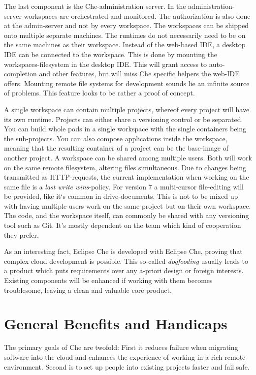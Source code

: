 \documentclass[utf8]{lni}
\begin{document}
The last component is the Che-administration server. 
In the administration-server workspaces are orchestrated and monitored. 
The authorization is also done at the admin-server and not by every workspace.
The workspaces can be shipped onto multiple separate machines.
The runtimes do not necessarily need to be on the same machines as their workspace. 
Instead of the web-based IDE, a desktop IDE can be connected to the workspace. 
This is done by mounting the workspaces-filesystem in the desktop  IDE. 
This  will grant access to auto-completion and other features, but will miss Che specific helpers the web-IDE offers. 
Mounting remote file systems for development sounds lie an infinite source of problems.
This feature looks to be rather a proof of concept.

A single workspace can contain multiple projects, whereof every project will have its own runtime. 
Projects can either share a versioning control or be separated. 
You can build whole pods in a single workspace with the single containers being the sub-projects. 
You can also compose applications inside the workspace, meaning that the resulting 
container of a project can be the base-image of another project. 
A workspace can be shared among multiple users. 
Both will work on the same remote filesystem, altering files simultaneous. 
Due to changes being transmitted as HTTP-requests, the current implementation when working on the same file is a \textit{last write wins}-policy. 
For version 7 a multi-cursor file-editing will be provided, like it`s common in 
drive-documents. 
This is not to be mixed up with having multiple users work on the same project but on their own workspace. 
The code, and the workspace itself, can commonly be shared with any versioning tool such as Git.
It's mostly dependent on the team which kind of cooperation they prefer. 

As  an  interesting  fact,  Eclipse  Che  is  developed  with Eclipse Che, proving that complex cloud development is possible. 
This so-called \textit{dogfooding} usually leads to a product which puts requirements over any a-priori design or foreign interests.  
Existing components will be enhanced if working with them becomes troublesome, leaving a clean and valuable core product. 

\section{General Benefits and Handicaps}
\label{sec:Eval}
The primary goals of Che are twofold: 
First it reduces failure when migrating software into the cloud and enhances the experience of working in a rich remote environment.
Second is to set up people into existing projects faster and fail safe.
\end{document}
